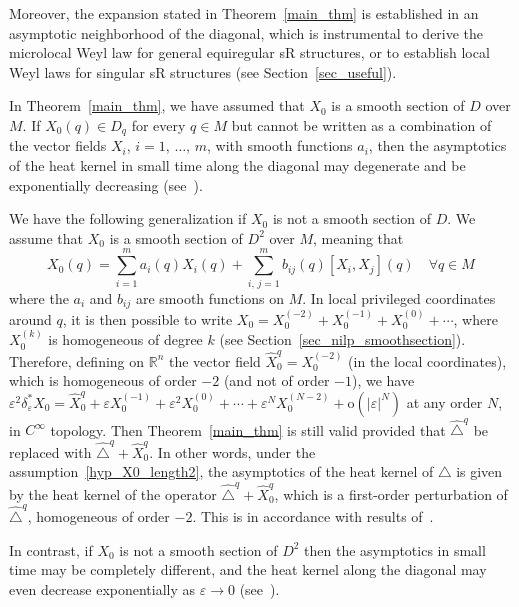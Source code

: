 \documentclass[AHL,Unicode,published]{cedram}
\newcommand*\R{\mathbb{R}}
\newcommand{\rmo}{\mathrm{o}}
\let\oldforall\forall
\renewcommand*{\forall}{\mathrel{\oldforall}}
\begin{document}
Moreover, the expansion stated in Theorem~\ref{main_thm} is established in an asymptotic neighborhood of the diagonal, which is instrumental to derive the microlocal Weyl law for general equiregular sR structures, or to establish local Weyl laws for singular sR structures (see Section~\ref{sec_useful}).



\begin{rema}\label{rem_X0_length2}
In Theorem~\ref{main_thm}, we have assumed that $X_0$ is a smooth section of $D$ over $M$. If $X_0(q)\in D_q$ for every $q\in M$ but cannot be written as a combination of the vector fields $X_i$, $i=1,\,\ldots,\,m$, with smooth functions $a_i$, then the asymptotics of the heat kernel in small time along the diagonal may degenerate and be exponentially decreasing (see~\cite{BenArousLeandre_PTRF1991_1,BenArousLeandre_PTRF1991_2}).

We have the following generalization if $X_0$ is not a smooth section of $D$. We assume that $X_0$ is a smooth section of $D^2$ over $M$, meaning that
\begin{equation}\label{hyp_X0_length2}
X_0(q) = \sum_{i=1}^m a_i(q) X_i(q) + \sum_{i,\,j=1}^m b_{ij}(q) [X_i,X_j](q)\quad \forall q\in M
\end{equation}
where the $a_i$ and $b_{ij}$ are smooth functions on $M$. In local privileged coordinates around $q$, it is then possible to write $X_0 = X_0^{(-2)} + X_0^{(-1)} + X_0^{(0)} + \cdots$, where $X_0^{(k)}$ is homogeneous of degree $k$ (see Section~\ref{sec_nilp_smoothsection}). Therefore, defining on $\R^n$ the vector field $\widehat{X}_0^{q}=X_0^{(-2)}$ (in the local coordinates), which is homogeneous of order $-2$ (and not of order $-1$), we have $\varepsilon^2\delta_\varepsilon^* X_0 = \widehat{X}_0^{q} + \varepsilon X_0^{(-1)} + \varepsilon^2 X_0^{(0)} + \cdots + \varepsilon^NX_0^{(N-2)} + \rmo(\vert\varepsilon\vert^N)$ at any order $N$, in $C^\infty$ topology. Then Theorem~\ref{main_thm} is still valid provided that $\widehat{\triangle}^{q}$ be replaced with $\widehat{\triangle}^{q}+\widehat{X}_0^{q}$. In other words, under the assumption~\eqref{hyp_X0_length2}, the asymptotics of the heat kernel of $\triangle$ is given by the heat kernel of the operator $\widehat{\triangle}^{q}+\widehat{X}_0^{q}$, which is a first-order perturbation of $\widehat{\triangle}^{q}$, homogeneous of order $-2$. This is in accordance with results of~\cite{BenArousLeandre_PTRF1991_2}.

In contrast, if $X_0$ is not a smooth section of $D^2$ then the asymptotics in small time may be completely different, and the heat kernel along the diagonal may even decrease exponentially as $\varepsilon\rightarrow 0$ (see~\cite{BenArousLeandre_PTRF1991_2}).
\end{rema}
\end{document}
